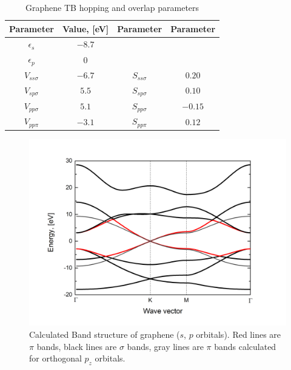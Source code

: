 \begin{table}[h!]
\begin{center}
\begin{tabular}{|c |c |c| c|}
\hline
Parameter&Value, [eV]&Parameter&Parameter\\ \hline
$\epsilon_s$ &$- 8.7$ & &\\ \hline
$\epsilon_p$&$0$ & &\\ \hline
$V_{ss\sigma}$&$- 6.7$ & $S_{ss\sigma}$&$0.20$\\ \hline
$V_{sp\sigma} $&$5.5$ & $S_{sp\sigma}$&$0.10$\\  \hline
$V_{pp\sigma}$&$5.1$ & $S_{pp\sigma}$&$- 0.15$\\ \hline
$V_{pp\pi}$&$- 3.1$ & $S_{pp\pi}$&$0.12$ \\ \hline  
\end{tabular}
\end{center}
\caption{Graphene TB hopping and overlap parameters \cite{basics}}
\label{tab:graphene_overlap_parameters}
\end{table}

\begin{figure}[h] 
\begin{center}
  \includegraphics[width=0.8\linewidth]{img/graphene_sp}
  \caption{Calculated Band structure of graphene ($s$, $p$ orbitals). Red lines are $\pi$ bands, black lines are $\sigma$ bands, gray lines are $\pi$ bands calculated for orthogonal $p_z$ orbitals. \label{fig:graphene_sp}}
\end{center}
\end{figure}

